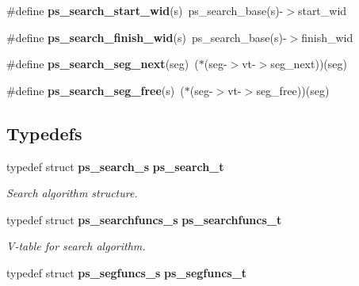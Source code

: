 \begin{DoxyCompactItemize}
\item 
\#define {\bfseries ps\-\_\-search\-\_\-start\-\_\-wid}(s)~ps\-\_\-search\-\_\-base(s)-\/$>$start\-\_\-wid\label{pocketsphinx__internal_8h_a6dc7da2c1bc3bfb15d5fbe3618a4e3d4}

\item 
\#define {\bfseries ps\-\_\-search\-\_\-finish\-\_\-wid}(s)~ps\-\_\-search\-\_\-base(s)-\/$>$finish\-\_\-wid\label{pocketsphinx__internal_8h_aaeee657147579bc652c494989622f6b4}

\item 
\#define {\bfseries ps\-\_\-search\-\_\-seg\-\_\-next}(seg)~($\ast$(seg-\/$>$vt-\/$>$seg\-\_\-next))(seg)\label{pocketsphinx__internal_8h_ae7c150fad9fc9e8a13e632a1386b8f56}

\item 
\#define {\bfseries ps\-\_\-search\-\_\-seg\-\_\-free}(s)~($\ast$(seg-\/$>$vt-\/$>$seg\-\_\-free))(seg)\label{pocketsphinx__internal_8h_a38f6b225e3eace3793cdae8135b0aaab}

\end{DoxyCompactItemize}
\subsection*{Typedefs}
\begin{DoxyCompactItemize}
\item 
typedef struct {\bf ps\-\_\-search\-\_\-s} {\bf ps\-\_\-search\-\_\-t}\label{pocketsphinx__internal_8h_adc3de4d62e46c5e6cb93d09fb61be8ee}

\begin{DoxyCompactList}\small\item\em Search algorithm structure. \end{DoxyCompactList}\item 
typedef struct {\bf ps\-\_\-searchfuncs\-\_\-s} {\bf ps\-\_\-searchfuncs\-\_\-t}\label{pocketsphinx__internal_8h_a0eae078e32bd5f339792884c68aad8b3}

\begin{DoxyCompactList}\small\item\em V-\/table for search algorithm. \end{DoxyCompactList}\item 
typedef struct {\bf ps\-\_\-segfuncs\-\_\-s} {\bfseries ps\-\_\-segfuncs\-\_\-t}\label{pocketsphinx__internal_8h_a08187b85c6bc5b4991632dc78e237977}

\end{DoxyCompactItemize}
